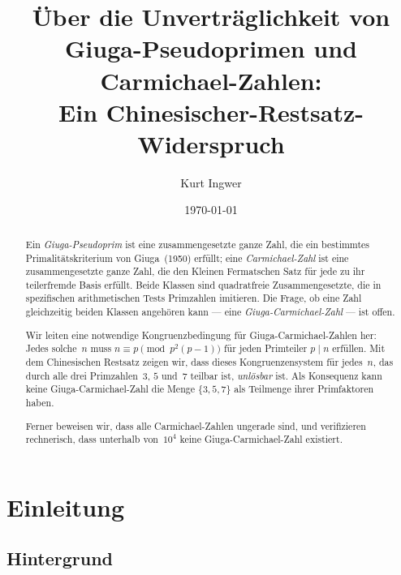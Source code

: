 \documentclass[12pt,a4paper]{amsart}
\theoremstyle{definition}
\begin{document}

\title{Über die Unverträglichkeit von Giuga-Pseudoprimen und Carmichael-Zahlen:\\
       Ein Chinesischer-Restsatz-Widerspruch}

\author{Kurt Ingwer}
\address{Specialist Mathematics Project, Version Build 43}
\date{\today}

\begin{abstract}
Ein \emph{Giuga-Pseudoprim} ist eine zusammengesetzte ganze Zahl, die ein bestimmtes
Primalitätskriterium von Giuga~(1950) erfüllt; eine \emph{Carmichael-Zahl} ist eine
zusammengesetzte ganze Zahl, die den Kleinen Fermatschen Satz für jede zu ihr teilerfremde
Basis erfüllt. Beide Klassen sind quadratfreie Zusammengesetzte, die in spezifischen
arithmetischen Tests Primzahlen imitieren. Die Frage, ob eine Zahl gleichzeitig beiden
Klassen angehören kann — eine \emph{Giuga-Carmichael-Zahl} — ist offen.

Wir leiten eine notwendige Kongruenzbedingung für Giuga-Carmichael-Zahlen her:
Jedes solche~$n$ muss $n \equiv p \pmod{p^2(p-1)}$ für jeden Primteiler $p \mid n$ erfüllen.
Mit dem Chinesischen Restsatz zeigen wir, dass dieses Kongruenzensystem für jedes~$n$,
das durch alle drei Primzahlen~$3$, $5$ und~$7$ teilbar ist, \emph{unlösbar} ist.
Als Konsequenz kann keine Giuga-Carmichael-Zahl die Menge $\{3, 5, 7\}$ als Teilmenge
ihrer Primfaktoren haben.

Ferner beweisen wir, dass alle Carmichael-Zahlen ungerade sind, und verifizieren
rechnerisch, dass unterhalb von~$10^4$ keine Giuga-Carmichael-Zahl existiert.
\end{abstract}

\maketitle

\section{Einleitung}

\subsection{Hintergrund}
\end{document}
